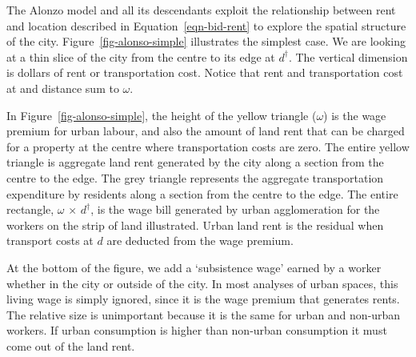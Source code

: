 The \Gls{Alonzo model} and all its descendants exploit the relationship between rent and location  described in  Equation~\ref{eqn-bid-rent} to explore the spatial structure of the city. Figure~\ref{fig-alonso-simple} illustrates the simplest case. We are looking at a thin slice of the city from the centre to its edge at $d^\dagger$. The vertical dimension is dollars of rent or transportation cost.  Notice that rent and transportation cost at and distance sum to $\omega$.




In Figure~\ref{fig-alonso-simple}, the height of the yellow triangle ($\omega$) is the wage premium for urban labour, and also the amount of land rent that can be charged for a property at the centre %
where transportation costs are zero. The entire yellow triangle is aggregate land rent generated by the city along a section from the centre to the edge. 
The grey triangle represents the aggregate transportation expenditure by residents along a section from the centre to the edge. 
The entire rectangle, $\omega$ $\times$ $d^\dagger$, is the wage bill generated by urban agglomeration for the workers on the strip of land illustrated. Urban land rent is the residual when transport costs at $d$ are deducted from the wage premium. %

At the bottom of the figure, we add a `subsistence wage'  earned by a worker whether in the city or outside of the city. In most analyses of urban spaces, this living wage is simply ignored, since it is the wage premium that generates rents.  The relative size is unimportant because it is the same for urban and non-urban workers. If urban consumption is higher than non-urban consumption it must come out of the land rent.

